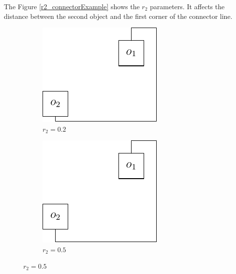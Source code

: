 \documentclass[a4paper,12pt]{report}
\begin{document}
The Figure \ref{r2_connectorExample} shows the $r_2$ parameters. It affects the distance between the second object and the
first corner of the connector line.

\begin{figure}
  \centering
  \begin{subfigure}{.33\textwidth}
    \centering
    \includegraphics[width=0.9\linewidth]{connectorExample_r2_0_2.pdf}
    \caption{$r_2=0.2$}
  \end{subfigure}\hfill
  \begin{subfigure}{.33\textwidth}
    \centering
    \includegraphics[width=0.9\linewidth]{connectorExample_r2_0_5.pdf}
    \caption{$r_2=0.5$}

\end{subfigure}
\end{figure}
\end{document}
